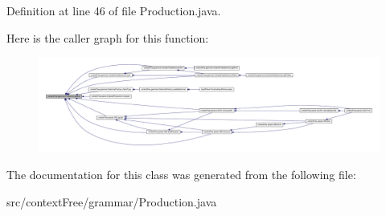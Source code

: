 Definition at line 46 of file Production.\-java.



Here is the caller graph for this function\-:
\nopagebreak
\begin{figure}[H]
\begin{center}
\leavevmode
\includegraphics[width=350pt]{classcontext_free_1_1grammar_1_1_production_a6b42819c4b8af1aa759edf3ad5978f67_icgraph}
\end{center}
\end{figure}




The documentation for this class was generated from the following file\-:\begin{DoxyCompactItemize}
\item 
src/context\-Free/grammar/Production.\-java\end{DoxyCompactItemize}
